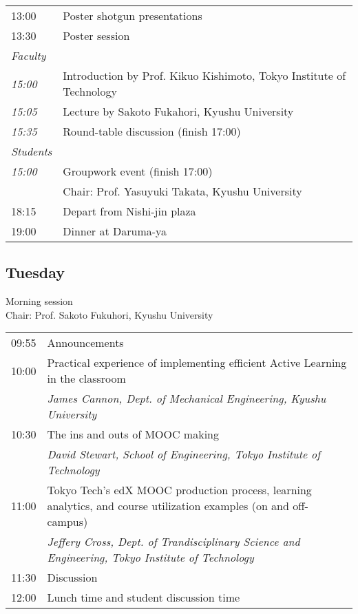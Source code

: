 \noindent\begin{tabular}{|l|l|}
    \hline
    13:00   & Poster shotgun presentations \\
    13:30   & Poster session \\
    \emph{Faculty} & \\
    \emph{15:00} & Introduction by Prof. Kikuo Kishimoto, Tokyo Institute of Technology \\
    \emph{15:05} & Lecture by Sakoto Fukahori, Kyushu University \\
    \emph{15:35} & Round-table discussion (finish 17:00) \\
    \emph{Students} & \\
    \emph{15:00} & Groupwork event (finish 17:00) \\
            & Chair: Prof. Yasuyuki Takata, Kyushu University \\
    18:15   & Depart from Nishi-jin plaza \\
    19:00   & Dinner at Daruma-ya \\
    \hline
\end{tabular}

\subsection*{Tuesday}

\vspace{2em}
Morning session \\
Chair: Prof. Sakoto Fukuhori, Kyushu University

\noindent\begin{tabular}{|l|l|}
    \hline
    09:55   & Announcements \\
    10:00   & Practical experience of implementing efficient Active Learning in the classroom \\
            & \emph{James Cannon, Dept. of Mechanical Engineering, Kyushu University} \\
    10:30   & The ins and outs of MOOC making \\
            & \emph{David Stewart, School of Engineering, Tokyo Institute of Technology} \\
    11:00   & Tokyo Tech’s edX MOOC production process, learning analytics, and course utilization examples (on and off-campus) \\
            & \emph{Jeffery Cross, Dept. of Trandisciplinary Science and Engineering, Tokyo Institute of Technology} \\
    11:30   & Discussion \\
    12:00   & Lunch time and student discussion time \\

    \hline
\end{tabular}

